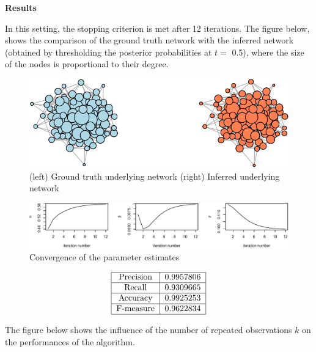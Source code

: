 \documentclass[]{article}
\begin{document}
\textbf{Results}

In this setting, the stopping criterion is met after 12 iterations. The
figure below, shows the comparison of the ground truth network with the
inferred network (obtained by thresholding the posterior probabilities
at \(t=\) 0.5), where the size of the nodes is proportional to their
degree.

\begin{figure}
\centering
\includegraphics{report_files/figure-latex/unnamed-chunk-4-1.pdf}
\caption{\label{fig:comparison}(left) Ground truth underlying network
(right) Inferred underlying network}
\end{figure}

\begin{figure}[H]

{\centering \includegraphics{report_files/figure-latex/unnamed-chunk-5-1} 

}

\caption{\label{fig:figs} Convergence of the parameter estimates}\label{fig:unnamed-chunk-5}
\end{figure}

\[
\centering\begin{tabular}{|c|c|}\hline Precision & 0.9957806 \\ \hline Recall & 0.9309665 \\ \hline Accuracy & 0.9925253 \\ \hline F-measure & 0.9622834 \\ \hline\end{tabular}\]

The figure below shows the influence of the number of repeated
observations \(k\) on the performances of the algorithm.
\end{document}
